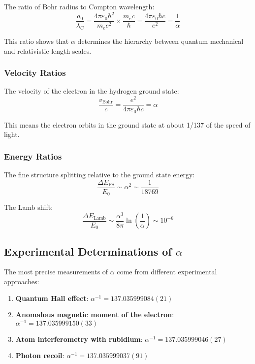 \documentclass[12pt,a4paper]{article}
\theoremstyle{definition}
\begin{document}
	The ratio of Bohr radius to Compton wavelength:
	\begin{equation}
		\frac{a_0}{\lambda_C} = \frac{4\pi\varepsilon_0\hbar^2}{m_e e^2} \times \frac{m_e c}{\hbar} = \frac{4\pi\varepsilon_0\hbar c}{e^2} = \frac{1}{\alpha}
	\end{equation}
	
	This ratio shows that $\alpha$ determines the hierarchy between quantum mechanical and relativistic length scales.
	
	\subsubsection{Velocity Ratios}
	
	The velocity of the electron in the hydrogen ground state:
	\begin{equation}
		\frac{v_{\text{Bohr}}}{c} = \frac{e^2}{4\pi\varepsilon_0\hbar c} = \alpha
	\end{equation}
	
	This means the electron orbits in the ground state at about 1/137 of the speed of light.
	
	\subsubsection{Energy Ratios}
	
	The fine structure splitting relative to the ground state energy:
	\begin{equation}
		\frac{\Delta E_{\text{FS}}}{E_0} \sim \alpha^2 \sim \frac{1}{18769}
	\end{equation}
	
	The Lamb shift:
	\begin{equation}
		\frac{\Delta E_{\text{Lamb}}}{E_0} \sim \frac{\alpha^3}{8\pi} \ln\left(\frac{1}{\alpha}\right) \sim 10^{-6}
	\end{equation}
	
	\subsection{Experimental Determinations of $\alpha$}
	
	The most precise measurements of $\alpha$ come from different experimental approaches:
	
	\begin{enumerate}
		\item \textbf{Quantum Hall effect}: $\alpha^{-1} = 137.035999084(21)$
		\item \textbf{Anomalous magnetic moment of the electron}: $\alpha^{-1} = 137.035999150(33)$
		\item \textbf{Atom interferometry with rubidium}: $\alpha^{-1} = 137.035999046(27)$
		\item \textbf{Photon recoil}: $\alpha^{-1} = 137.035999037(91)$
	\end{enumerate}
	
\end{document}
